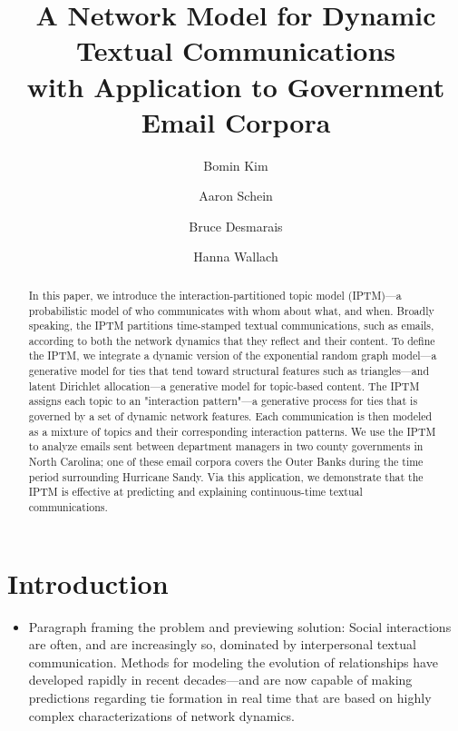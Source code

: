 \documentclass[a4paper]{article}
\title{A Network Model for Dynamic Textual Communications \\with Application to
	Government Email Corpora}
\author[1]{Bomin Kim}
\author[3]{Aaron Schein}
\author[1]{Bruce Desmarais}
\author[2,3]{Hanna Wallach}
\affil[1]{Pennsylvania State University}
\affil[2]{Microsoft Research NYC}
\affil[3]{University of Massachusetts Amherst}
\begin{document}
\setlength{\parindent}{0pt}
\maketitle
\begin{abstract}
	
	\noindent In this paper, we introduce the interaction-partitioned topic model
	(IPTM)---a probabilistic model of who communicates with whom about
	what, and when. Broadly speaking, the IPTM partitions time-stamped
	textual communications, such as emails, according to both the network
	dynamics that they reflect and their content. To define the IPTM, we
	integrate a dynamic version of the exponential random graph model---a
	generative model for ties that tend toward structural features such as
	triangles---and latent Dirichlet allocation---a generative model for
	topic-based content. The IPTM assigns each topic to an "interaction
	pattern"---a generative process for ties that is governed by a set of
	dynamic network features. Each communication is then modeled as a
	mixture of topics and their corresponding interaction patterns. We use
	the IPTM to analyze emails sent between department managers in two
	county governments in North Carolina; one of these email corpora
	covers the Outer Banks during the time period surrounding Hurricane
	Sandy. Via this application, we demonstrate that the IPTM is effective
	at predicting and explaining continuous-time textual communications.
\end{abstract}
\section{Introduction} \label{sec: Introduction}

\begin{itemize}
\item Paragraph framing the problem and previewing solution: Social interactions are often, and are increasingly so, dominated by interpersonal textual communication. Methods for modeling the evolution of relationships have developed rapidly in recent decades---and are now capable of making predictions regarding tie formation in real time that are based on highly complex characterizations of network dynamics. 
\end{itemize}
\end{document}
